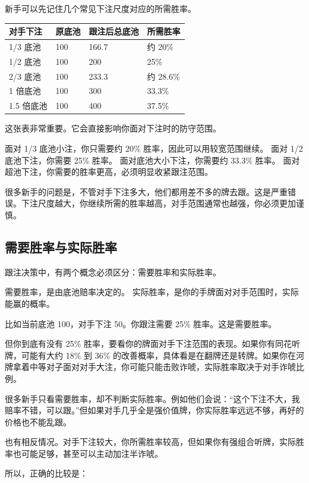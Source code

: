 新手可以先记住几个常见下注尺度对应的所需胜率。

\begin{center}
\begin{tabular}{llll}
\toprule
\textbf{对手下注} & \textbf{原底池} & \textbf{跟注后总底池} & \textbf{所需胜率} \\
\midrule
1/3 底池 & 100 & 166.7 & 约 20\% \\
1/2 底池 & 100 & 200 & 25\% \\
2/3 底池 & 100 & 233.3 & 约 28.6\% \\
1 倍底池 & 100 & 300 & 33.3\% \\
1.5 倍底池 & 100 & 400 & 37.5\% \\
\bottomrule
\end{tabular}
\end{center}

这张表非常重要。它会直接影响你面对下注时的防守范围。

面对 1/3 底池小注，你只需要约 20\% 胜率，因此可以用较宽范围继续。
面对 1/2 底池下注，你需要 25\% 胜率。
面对底池大小下注，你需要约 33.3\% 胜率。
面对超池下注，你需要的胜率更高，必须明显收紧跟注范围。

很多新手的问题是，不管对手下注多大，他们都用差不多的牌去跟。这是严重错误。下注尺度越大，你继续所需的胜率越高，对手范围通常也越强，你必须更加谨慎。

\subsection{需要胜率与实际胜率}

跟注决策中，有两个概念必须区分：需要胜率和实际胜率。

需要胜率，是由底池赔率决定的。
实际胜率，是你的手牌面对对手范围时，实际能赢的概率。

比如当前底池 100，对手下注 50。你跟注需要 25\% 胜率。这是需要胜率。

但你到底有没有 25\% 胜率，要看你的牌面对手下注范围的表现。如果你有同花听牌，可能有大约 18\% 到 36\% 的改善概率，具体看是在翻牌还是转牌。如果你在河牌拿着中等对子面对对手大注，你可能只能击败诈唬，实际胜率取决于对手诈唬比例。

很多新手只看需要胜率，却不判断实际胜率。例如他们会说：“这个下注不大，我赔率不错，可以跟。”但如果对手几乎全是强价值牌，你实际胜率远远不够，再好的价格也不能乱跟。

也有相反情况。对手下注较大，你所需胜率较高，但如果你有强组合听牌，实际胜率也可能足够，甚至可以主动加注半诈唬。

所以，正确的比较是：


